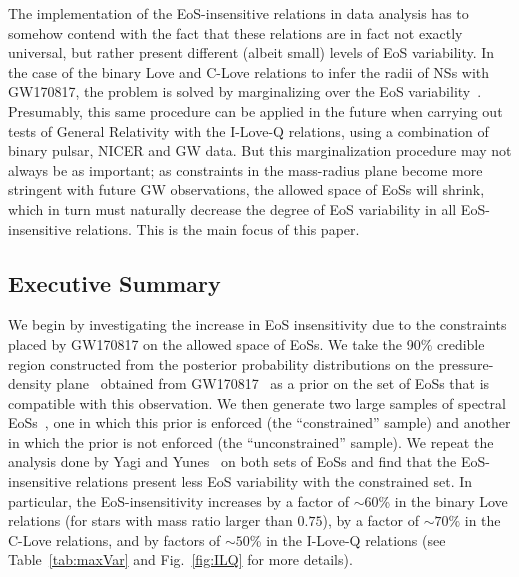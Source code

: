 \documentclass[prd,twocolumn,nofootinbib,superscriptaddress,amsmath,amssymb]{revtex4-1}
\begin{document}
The implementation of the EoS-insensitive relations in data analysis has to somehow contend with the fact that these relations are in fact not exactly universal, but rather present different (albeit small) levels of EoS variability. In the case of the binary Love and C-Love relations to infer the radii of NSs with GW170817, the problem is solved by marginalizing over the EoS variability~\cite{Katerina:residuals}. Presumably, this same procedure can be applied in the future when carrying out tests of General Relativity with the I-Love-Q relations, using a combination of binary pulsar, NICER and GW data. But this marginalization procedure may not always be as important; as constraints in the mass-radius plane become more stringent with future GW observations, the allowed space of EoSs will shrink, which in turn must naturally decrease the degree of EoS variability in all EoS-insensitive relations. This is the main focus of this paper.  



\subsection{Executive Summary}

We begin by investigating the increase in EoS insensitivity due to the constraints placed by GW170817 on the allowed space of EoSs. We take the 90\% credible region constructed from the posterior probability distributions on the pressure-density plane~\cite{Carney:2018sdv,LIGO:posterior} obtained from GW170817~\cite{TheLIGOScientific:2017qsa} as a prior on the set of EoSs that is compatible with this observation. We then generate two large samples of spectral EoSs~\cite{Lindblom:2018rfr}, one in which this prior is enforced (the ``constrained'' sample) and another in which the prior is not enforced (the ``unconstrained'' sample). We repeat the analysis done by Yagi and Yunes~\cite{Yagi:binLove,Yagi:ILQ} on both sets of EoSs and find that the EoS-insensitive relations present less EoS variability with the constrained set. In particular, the EoS-insensitivity increases by a factor of $\sim 60$\% in the binary Love relations (for stars with mass ratio larger than $0.75$), by a factor of $\sim 70\%$ in the C-Love relations, and by factors of $\sim 50$\% in the I-Love-Q relations (see Table~\ref{tab:maxVar} and Fig.~\ref{fig:ILQ} for more details). 
\end{document}
